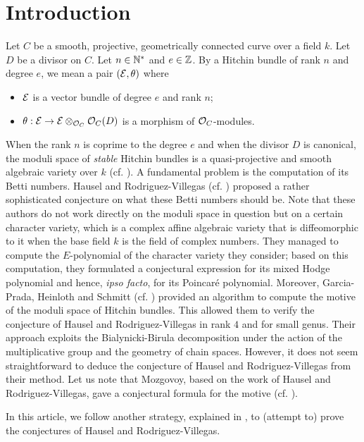 \renewcommand{\subjclassname}{\textup{2010} Mathematics Subject Classification}

\maketitle

\tableofcontents

\section{Introduction}

\begin{paragr}
Let $C$ be a smooth, projective, geometrically connected curve over a field $k$. Let $D$ be a divisor on $C$. Let $n\in \mathbb{N}^*$ and $e\in \mathbb{Z}$. By a Hitchin bundle of rank $n$ and degree $e$, we mean a pair $(\mathcal{E},\theta)$ where
  \begin{itemize}
  \item $\mathcal{E}$ is a vector bundle of degree $e$ and rank $n$;
  \item $\theta: \mathcal{E}\to\mathcal{E}\otimes_{\mathcal{O}_C}\mathcal{O}_C(D)$ is a morphism of $\mathcal{O}_C$-modules.
  \end{itemize}

When the rank $n$ is coprime to the degree $e$ and when the divisor $D$ is canonical, the moduli space of \emph{stable} Hitchin bundles is a quasi-projective and smooth algebraic variety over $k$ (cf. \cite{Nit}). A fundamental problem is the computation of its Betti numbers. Hausel and Rodriguez-Villegas (cf. \cite{HRV}) proposed a rather sophisticated conjecture on what these Betti numbers should be. Note that these authors do not work directly on the moduli space in question but on a certain character variety, which is a complex affine algebraic variety that is diffeomorphic to it when the base field $k$ is the field of complex numbers. They managed to compute the $E$-polynomial of the character variety they consider; based on this computation, they formulated a conjectural expression for its mixed Hodge polynomial and hence, \emph{ipso facto}, for its Poincar\'{e} polynomial. Moreover, Garcia-Prada, Heinloth and Schmitt (cf. \cite{GPHS}) provided an algorithm to compute the motive of the moduli space of Hitchin bundles. This allowed them to verify the conjecture of Hausel and Rodriguez-Villegas in rank $4$ and for small genus. Their approach exploits the Bialynicki-Birula decomposition under the action of the multiplicative group and the geometry of chain spaces. However, it does not seem straightforward to deduce the conjecture of Hausel and Rodriguez-Villegas from their method. Let us note that Mozgovoy, based on the work of Hausel and Rodriguez-Villegas, gave a conjectural formula for the motive (cf. \cite{Moz}).

In this article, we follow another strategy, explained in \cite{scfh}, to (attempt to) prove the conjectures of Hausel and Rodriguez-Villegas.
\end{paragr}

